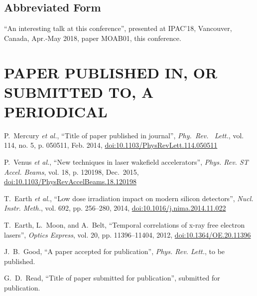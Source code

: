 \subsection{Abbreviated Form}

\begin{thebibliography}{9} %
\setcounter{enumi}{4}
	“An interesting talk at this conference”,
	presented at IPAC’18, Vancouver, Canada, Apr.-May 2018, 
	paper MOAB01, this conference.
\end{thebibliography}


\vspace*{-.5\baselineskip}
\section{PAPER PUBLISHED IN, OR SUBMITTED TO, A PERIODICAL}

\begin{thebibliography}{99} %
  \setcounter{enumi}{5}
		P.~Mercury \emph{et al.},
		“Title of paper published in journal”,
		\emph{Phy.~Rev.~	Lett.}, vol. 114, no. 5,
		p. 050511, Feb. 2014,
		\url{doi:10.1103/PhysRevLett.114.050511}

		P.~Venus \emph{et al.},
		“New techniques in laser wakefield accelerators”,
		\emph{Phys. Rev. ST Accel. Beams}, vol. 18,
		p. 120198, Dec.~2015, \newline
		\url{doi:10.1103/PhysRevAccelBeams.18.120198} 

		T.~Earth \emph{et al.},
		“Low dose irradiation impact on modern silicon detectors”,
		\emph{Nucl. Instr. Meth.}, vol. 692, pp. 256--280, 2014,
		\url{doi:10.1016/j.nima.2014.11.022}
	
		T.~Earth, L.~Moon, and A.~Belt,
		“Temporal correlations of x-ray free electron lasers”,
		\emph{Optics Express}, vol. 20, pp. 11396--11404, 2012,
		\url{doi:10.1364/OE.20.11396}

		J.~B.~Good,
		“A paper accepted for publication”,
		\emph{Phys. Rev. Lett.}, to be published.

		G.~D.~Read,
		“Title of paper submitted for publication”,
		submitted for publication.
\end{thebibliography}


